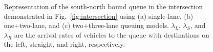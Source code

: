 \documentclass[conference]{IEEEtran}
\begin{document}
\begin{figure}[t!]
\begin{center}
\vspace{-10pt}
 \hspace{15pt}
 \hspace{15pt}
\end{center}
\begin{center}
\vspace{-10pt}
\caption{\label{fig:queueModels} Representation of the south-north bound queue in the intersection demonstrated in Fig.~\ref{fig:intersection} using (a) single-lane, (b) one+two-lane, and (c) two+three-lane queuing models. $\lambda_L$, $\lambda_S$, and $\lambda_R$ are the arrival rates of vehicles to the queue with destinations on the left, straight, and right, respectively.}
\vspace{-25pt}
\end{center}
\end{figure}
\end{document}
